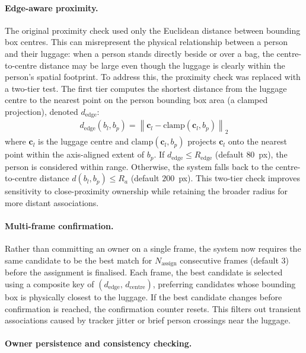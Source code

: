\paragraph{Edge-aware proximity.}

The original proximity check used only the Euclidean distance between bounding
box centres. This can misrepresent the physical relationship between a person
and their luggage: when a person stands directly beside or over a bag, the
centre-to-centre distance may be large even though the luggage is clearly
within the person's spatial footprint. To address this, the proximity check was
replaced with a two-tier test. The first tier computes the shortest distance
from the luggage centre to the nearest point on the person bounding box area (a
clamped projection), denoted $d_{\text{edge}}$:
\begin{align}
	d_{\text{edge}}(b_l, b_p) = \left\lVert \mathbf{c}_l - \text{clamp}(\mathbf{c}_l, b_p) \right\rVert_2
\end{align}
where $\mathbf{c}_l$ is the luggage centre and
$\text{clamp}(\mathbf{c}_l, b_p)$ projects $\mathbf{c}_l$ onto the nearest
point within the axis-aligned extent of $b_p$. If
$d_{\text{edge}} \leq R_{\text{edge}}$ (default $80$~px), the person is
considered within range. Otherwise, the system falls back to the centre-to-centre
distance $d(b_l, b_p) \leq R_a$ (default $200$~px). This two-tier check
improves sensitivity to close-proximity ownership while retaining the broader
radius for more distant associations.

\paragraph{Multi-frame confirmation.}

Rather than committing an owner on a single frame, the system now requires the
same candidate to be the best match for $N_{\text{assign}}$ consecutive frames
(default $3$) before the assignment is finalised. Each frame, the best
candidate is selected using a composite key of $(d_{\text{edge}},\,
	d_{\text{centre}})$, preferring candidates whose bounding box is physically
closest to the luggage. If the best candidate changes before confirmation is
reached, the confirmation counter resets. This filters out transient
associations caused by tracker jitter or brief person crossings near the
luggage.

\paragraph{Owner persistence and consistency checking.}

